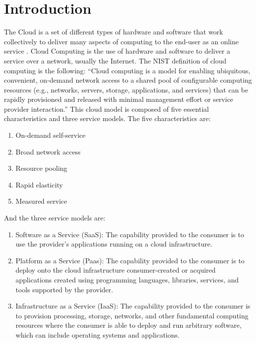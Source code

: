 \chapter{Introduction}\label{ch:introduction}
The Cloud is a set of different types of hardware and software that work collectively to deliver many aspects of computing to the end-user as an online service \cite{lenovo_cloud}. Cloud Computing is the use of hardware and software to deliver a service over a network, usually the Internet. The NIST definition of cloud computing is the following: ``Cloud computing is a model for enabling ubiquitous, convenient, on-demand network access to a shared pool of configurable computing resources (e.g., networks, servers, storage, applications, and services) that can be rapidly provisioned and released with minimal management effort or service provider interaction.''\cite{nist:cloud_computing} This cloud model is composed of five essential characteristics and three service models. The five characteristics are:
\begin{enumerate}
    \item On-demand self-service
    \item Broad network access
    \item Resource pooling
    \item Rapid elasticity
    \item Measured service
\end{enumerate}

\noindent
And the three service models are:
\begin{enumerate}
    \item Software as a Service (SaaS): The capability provided to the consumer is to use the provider's applications running on a cloud infrastructure.
    \item Platform as a Service (Paas): The capability provided to the consumer is to deploy onto the cloud infrastructure consumer-created or acquired applications created using programming languages, libraries, services, and tools supported by the provider.
    \item Infrastructure as a Service (IaaS): The capability provided to the consumer is to provision processing, storage, networks, and other fundamental computing resources where the consumer is able to deploy and run arbitrary software, which can include operating systems and applications.
\end{enumerate}

